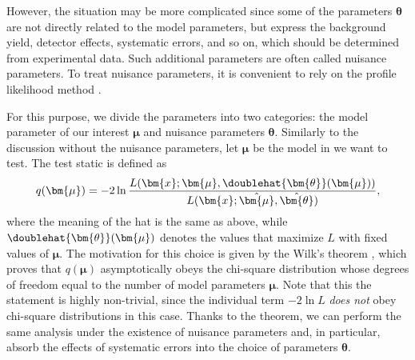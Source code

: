 \documentclass[12pt,twoside,book]{article}
\begin{document}
However, the situation may be more complicated since some of the parameters $\bm{\theta}$ are not directly related to the model parameters, but express the background yield, detector effects, systematic errors, and so on, which should be determined from experimental data.
Such additional parameters are often called nuisance parameters.
To treat nuisance parameters, it is convenient to rely on the profile likelihood method \cite{Cowan:2010js}.

For this purpose, we divide the parameters into two categories: the model parameter of our interest $\bm{\mu}$ and nuisance parameters $\bm{\theta}$.
Similarly to the discussion without the nuisance parameters, let $\bm{\mu}$ be the model in we want to test.
The test static is defined as
\begin{align}
  q (\bm{\mu}) =
  -2 \ln \frac{L(\bm{x} ; \bm{\mu}, \doublehat{\bm{\theta}} (\bm{\mu}))}
  {L(\bm{x} ; \hat{\bm{\mu}}, \hat{\bm{\theta}})},
\end{align}
where the meaning of the hat is the same as above, while $\doublehat{\bm{\theta}} (\bm{\mu})$ denotes the values that maximize $L$ with fixed values of $\bm{\mu}$.
The motivation for this choice is given by the Wilk's theorem \cite{wilks1938}, which proves that $q (\bm{\mu})$ asymptotically obeys the chi-square distribution whose degrees of freedom equal to the number of model parameters $\bm{\mu}$.
Note that this the statement is highly non-trivial, since the individual term $-2\ln L$ \textit{does not} obey chi-square distributions in this case.
Thanks to the theorem, we can perform the same analysis under the existence of nuisance parameters and, in particular, absorb the effects of systematic errors into the choice of parameters $\bm{\theta}$.


% 
% 
\end{document}
